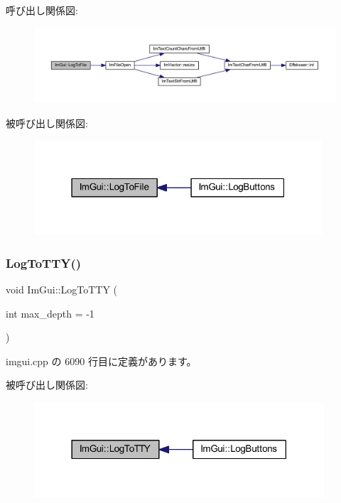 呼び出し関係図\+:\nopagebreak
\begin{figure}[H]
\begin{center}
\leavevmode
\includegraphics[width=350pt]{namespace_im_gui_ab62461a65c153b9f40842debef8aa755_cgraph}
\end{center}
\end{figure}
被呼び出し関係図\+:\nopagebreak
\begin{figure}[H]
\begin{center}
\leavevmode
\includegraphics[width=304pt]{namespace_im_gui_ab62461a65c153b9f40842debef8aa755_icgraph}
\end{center}
\end{figure}
\mbox{\label{namespace_im_gui_a37696f5296f33ae4218f53b40b81cccc}} 
\subsubsection{\texorpdfstring{Log\+To\+T\+T\+Y()}{LogToTTY()}}
{\footnotesize\ttfamily void Im\+Gui\+::\+Log\+To\+T\+TY (\begin{DoxyParamCaption}\item[{int}]{max\+\_\+depth = {\ttfamily -\/1} }\end{DoxyParamCaption})}



 imgui.\+cpp の 6090 行目に定義があります。

被呼び出し関係図\+:\nopagebreak
\begin{figure}[H]
\begin{center}
\leavevmode
\includegraphics[width=306pt]{namespace_im_gui_a37696f5296f33ae4218f53b40b81cccc_icgraph}
\end{center}
\end{figure}
\mbox{\label{namespace_im_gui_a15efb2cac4a54b35489c5984ba1b661a}} 
